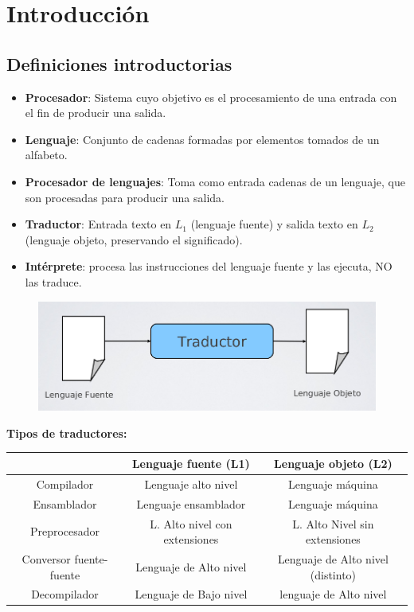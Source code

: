 \chapter{Introducción}

\section{Definiciones introductorias}

\begin{itemize}
	\item \textbf{Procesador}: Sistema cuyo objetivo es el procesamiento de una entrada con el fin de producir una salida.
	\item \textbf{Lenguaje}: Conjunto de cadenas formadas por elementos tomados de un alfabeto.
	\item \textbf{Procesador de lenguajes}: Toma como entrada cadenas de un lenguaje, que son procesadas para producir una salida.
	\item \textbf{Traductor}: Entrada texto en $L_1$ (lenguaje fuente) y salida texto en $L_2$ (lenguaje objeto, preservando el significado).
	\item \textbf{Intérprete}: procesa las instrucciones del lenguaje fuente y las ejecuta, NO las traduce.
\end{itemize}

\begin{figure}[h]
	\centering
	\includegraphics[width=0.7\linewidth]{img/1}
	\caption{}
	\label{fig:1}
\end{figure}

\textbf{Tipos de traductores:}
\begin{center}
	\begin{tabular}{|c|c|c|}
		\hline 
		& \textbf{Lenguaje fuente (L1)} & \textbf{Lenguaje objeto (L2)}  \\ 
		\hline 
		Compilador & Lenguaje alto nivel & Lenguaje máquina  \\ 
		\hline 
		Ensamblador & Lenguaje ensamblador & Lenguaje máquina  \\ 
		\hline 
		Preprocesador & L. Alto nivel con extensiones & L. Alto Nivel sin extensiones \\ 
		\hline 
		Conversor fuente-fuente & Lenguaje de Alto nivel & Lenguaje de Alto nivel (distinto)  \\ 
		\hline 
		Decompilador & Lenguaje de Bajo nivel & lenguaje de Alto nivel \\ 
		\hline 
	\end{tabular} 
\end{center}

